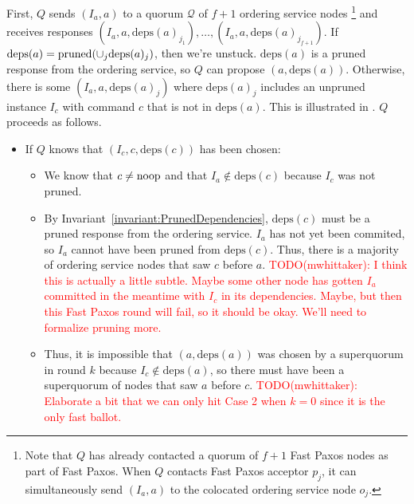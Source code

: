 \documentclass{mwhittaker}
\theoremstyle{definition}
\newcommand{\todo}[2]{\textcolor{red}{TODO(#1): #2}}
\newcommand{\deps}[1]{\text{deps}(#1)}
\newcommand{\invref}[1]{Invariant~\ref{invariant:#1}}
\begin{document}
First, $Q$ sends $(I_a, a)$ to a quorum $\mathcal{Q}$ of $f + 1$ ordering
service nodes%
\footnote{%
  Note that $Q$ has already contacted a quorum of $f + 1$ Fast Paxos nodes as
  part of Fast Paxos. When $Q$ contacts Fast Paxos acceptor $p_j$, it can
  simultaneously send $(I_a, a)$ to the colocated ordering service node $o_j$.
}
and receives responses $(I_a, a, \deps{a}_{j_1}), \ldots, (I_a, a,
\deps{a}_{j_{f+1}})$. If $\deps{a} = \pruned(\cup_j \deps{a}_j)$, then we're
unstuck. $\deps{a}$ is a pruned response from the ordering service, so $Q$ can
propose $(a, \deps{a})$.
%
Otherwise, there is some $(I_a, a, \deps{a}_j)$ where $\deps{a}_j$ includes an
unpruned instance $I_c$ with command $c$ that is not in $\deps{a}$. This is
illustrated in . $Q$ proceeds as follows.
\begin{itemize}
  \item
    If $Q$ knows that $(I_c, c, \deps{c})$ has been chosen:
    \begin{itemize}
      \item
        We know that $c \neq \text{noop}$ and that $I_a \notin \deps{c}$ because
        $I_c$ was not pruned.

      \item
        By \invref{PrunedDependencies}, $\deps{c}$ must be a pruned response
        from the ordering service. $I_a$ has not yet been commited, so $I_a$
        cannot have been pruned from $\deps{c}$. Thus, there is a majority of
        ordering service nodes that saw $c$ before $a$.
        \todo{mwhittaker}{%
          I think this is actually a little subtle. Maybe some other node has
          gotten $I_a$ committed in the meantime with $I_c$ in its
          dependencies. Maybe, but then this Fast Paxos round will fail, so it
          should be okay. We'll need to formalize pruning more.%
        }

      \item
        Thus, it is impossible that $(a, \deps{a})$ was chosen by a superquorum
        in round $k$ because $I_c \notin \deps{a}$, so there must have been a
        superquorum of nodes that saw $a$ before $c$.
        \todo{mwhittaker}{%
          Elaborate a bit that we can only hit Case 2 when $k = 0$ since it is
          the only fast ballot.%
        }


\end{itemize}
\end{itemize}
\end{document}
